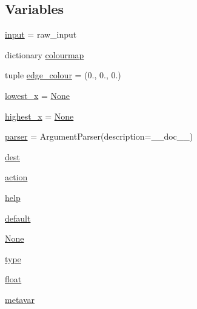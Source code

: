 \subsection*{Variables}
\begin{DoxyCompactItemize}
\item 
\mbox{\hyperlink{namespacepymavlink_1_1tools_1_1mavgraph_a928b14ed776682a5ebb2771542b9a0a1}{input}} = raw\+\_\+input
\item 
dictionary \mbox{\hyperlink{namespacepymavlink_1_1tools_1_1mavgraph_a327046b2526de86104baff4ee12491b6}{colourmap}}
\item 
tuple \mbox{\hyperlink{namespacepymavlink_1_1tools_1_1mavgraph_ac366aacb234e65fd78591f016c14244b}{edge\+\_\+colour}} = (0., 0., 0.)
\item 
\mbox{\hyperlink{namespacepymavlink_1_1tools_1_1mavgraph_ab5584d0ed00cdabd2f2e398a6f2fa6cb}{lowest\+\_\+x}} = \mbox{\hyperlink{namespacepymavlink_1_1tools_1_1mavgraph_ac228c9fead001187c8aeb74f0302fb9a}{None}}
\item 
\mbox{\hyperlink{namespacepymavlink_1_1tools_1_1mavgraph_acdf25cf5ff7a6fe89275cc858098e27d}{highest\+\_\+x}} = \mbox{\hyperlink{namespacepymavlink_1_1tools_1_1mavgraph_ac228c9fead001187c8aeb74f0302fb9a}{None}}
\item 
\mbox{\hyperlink{namespacepymavlink_1_1tools_1_1mavgraph_aaebc1136de1737f5e2385c24b0116c80}{parser}} = Argument\+Parser(description=\+\_\+\+\_\+doc\+\_\+\+\_\+)
\item 
\mbox{\hyperlink{namespacepymavlink_1_1tools_1_1mavgraph_aa2933b10f61d19dae3edec777bace1e5}{dest}}
\item 
\mbox{\hyperlink{namespacepymavlink_1_1tools_1_1mavgraph_a58d1e749cdfd32e32c96b12b41232328}{action}}
\item 
\mbox{\hyperlink{namespacepymavlink_1_1tools_1_1mavgraph_a2803f5f3d58334e8a302d3a994334ca9}{help}}
\item 
\mbox{\hyperlink{namespacepymavlink_1_1tools_1_1mavgraph_a67fc7dad2e637dbf68216f8a90eae782}{default}}
\item 
\mbox{\hyperlink{namespacepymavlink_1_1tools_1_1mavgraph_ac228c9fead001187c8aeb74f0302fb9a}{None}}
\item 
\mbox{\hyperlink{namespacepymavlink_1_1tools_1_1mavgraph_a6b0ee2dd540205466967e46d4a31a412}{type}}
\item 
\mbox{\hyperlink{namespacepymavlink_1_1tools_1_1mavgraph_a5001e8ed18d630b7c3a96fa5ef823940}{float}}
\item 
\mbox{\hyperlink{namespacepymavlink_1_1tools_1_1mavgraph_a4ceade42d6095cc9f8462dbcd31431ba}{metavar}}

\end{DoxyCompactItemize}
